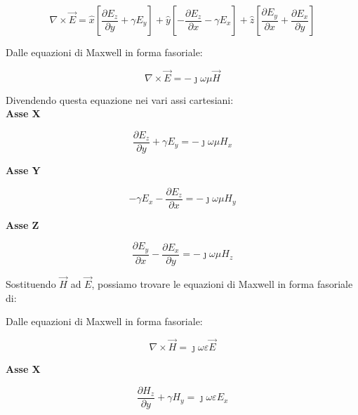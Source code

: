 {
    \Large 
    \begin{equation}
            \nabla \times \vec{E}
            =        
\hat{x} 
[
    \frac{\partial E_z}{\partial y} 
    +\gamma E_y
]    
+\hat{y} 
[
    -\frac{\partial E_z}{\partial x} 
    -\gamma E_x
]    
+\hat{z} 
[
    \frac{\partial E_y}{\partial x} 
    + \frac{\partial E_x}{\partial y}
] 
    \end{equation}
}       


Dalle equazioni di Maxwell in forma fasoriale: 

{
    \Large 
    \begin{equation}
        \nabla \times \vec{E} = -\jmath \omega \mu \vec{H}
    \end{equation}
}

Divendendo questa equazione nei vari assi cartesiani: \\ 

\textbf{Asse X} 

{
    \Large 
    \begin{equation}
        \frac{\partial E_z}{\partial y} + \gamma E_y 
        = 
        -\jmath \omega \mu H_x
    \end{equation}
}


\textbf{Asse Y} 

{
    \Large 
    \begin{equation}
        - \gamma E_x - \frac{\partial E_z}{\partial x}  
        = 
        -\jmath \omega \mu H_y
    \end{equation}
}



\textbf{Asse Z} 

{
    \Large 
    \begin{equation}
        \frac{\partial E_y}{\partial x} - \frac{\partial E_x}{\partial y} 
        = 
        -\jmath \omega \mu H_z
    \end{equation}
}

Sostituendo $\vec{H}$ ad $\vec{E}$, possiamo trovare le equazioni 
di Maxwell in forma fasoriale di: 

Dalle equazioni di Maxwell in forma fasoriale: 

{
    \Large 
    \begin{equation}
        \nabla \times \vec{H} = \jmath \omega \varepsilon \vec{E}
    \end{equation}
}


\textbf{Asse X} 

{
    \Large 
    \begin{equation}
        \frac{\partial H_z}{\partial y} + \gamma H_y 
        = 
        \jmath \omega \varepsilon E_x
    \end{equation}
}


